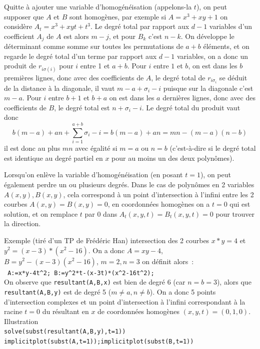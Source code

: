 \documentclass[a4paper,11pt]{article}
\begin{document}
Quitte \`a ajouter une variable d'homog\'en\'eisation (appelons-la $t$), on peut
supposer que $A$ et $B$ sont homog\`enes, par exemple
si $A=x^3+xy+1$ on consid\`ere $A_t=x^3+xyt+t^3$. Le degr\'e total 
par rapport aux $d-1$ variables d'un
coefficient $A_j$ de $A$ est alors $m-j$, et pour $B_k$ c'est $n-k$.
On d\'eveloppe le d\'eterminant comme somme sur toutes les
permutations de $a+b$ \'el\'ements, et on regarde le degr\'e
total d'un terme par rapport aux $d-1$ variables, on a donc
un produit de $r_{i \sigma(i)}$ pour $i$ entre 1 et $a+b$. Pour $i$
entre $1$ et $b$, on est dans les $b$ premi\`eres lignes, donc
avec des coefficients de $A$, le degr\'e total de $r_{i \sigma_i}$
se d\'eduit de la distance \`a la diagonale, il vaut
$m-a+\sigma_{i}-i$ puisque sur la diagonale c'est $m-a$.
Pour $i$ entre $b+1$ et $b+a$ on est dans les $a$ derni\`eres
lignes, donc avec des coefficients de $B$, le degr\'e total est
$n+\sigma_i-i$. Le degr\'e total du produit vaut donc
$$ b(m-a)+an+\sum_{i=1}^{a+b} \sigma_i -i = b(m-a)+an=mn-(m-a)(n-b)$$
il est donc au plus $mn$ avec \'egalit\'e si $m=a$ ou $n=b$
(c'est-\`a-dire si le degr\'e total est identique au degr\'e partiel
en $x$ pour au moins un des deux polyn\^omes).

Lorsqu'on enl\`eve la variable d'homog\'en\'eisation (en posant
$t=1$), on peut \'egalement perdre un ou plusieurs degr\'es. Dans le
cas de polyn\^omes en 2 variables $A(x,y), B(x,y)$, cela correspond \`a un point
d'intersection \`a l'infini entre les 2 courbes $A(x,y)=B(x,y)=0$, en
coordonn\'ees homog\`enes on a $t=0$ qui est solution, et on remplace
$t$ par 0 dans $A_t(x,y,t)=B_t(x,y,t)=0$ pour trouver la direction.

Exemple (tir\'e d'un TP de Fr\'ed\'eric Han)
intersection des 2 courbes $x*y=4$ et $y^2=(x-3)*(x^2-16)$.
On a donc $A=xy-4$, 
$B=y^2-(x-3)(x^2-16)$, $m=2, n=3$
on d\'efinit alors~:\\
\verb| A:=x*y-4t^2; B:=y^2*t-(x-3t)*(x^2-16t^2);|\\
On observe que \verb|resultant(A,B,x)| est bien de degr\'e 6 (car
$n=b=3$), alors que \verb|resultant(A,B,y)| est de degr\'e 5 ($m \neq
a, n \neq b$).
On a donc 5 points d'intersection complexes et un point d'intersection
\`a l'infini correspondant \`a la racine $t=0$ du r\'esultant en $x$ 
de coordonn\'ees homog\`enes
$(x,y,t)=(0,1,0)$. Illustration\\
\verb|solve(subst(resultant(A,B,y),t=1))|\\
\verb|implicitplot(subst(A,t=1));implicitplot(subst(B,t=1))|
\end{document}

